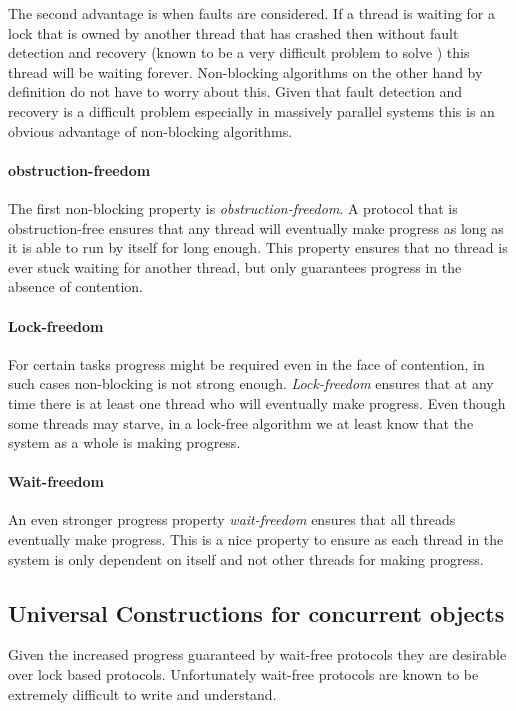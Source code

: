 The second advantage is when faults are considered.
If a thread is waiting for a lock that is owned by another thread that has crashed
then without fault detection and recovery (known to be a very difficult problem to solve \cite{}
) this thread will be waiting forever.
Non-blocking algorithms on the other hand by definition do not have to worry about this.
Given that fault detection and recovery is a difficult problem especially in massively parallel
systems this is an obvious advantage of non-blocking algorithms.

\paragraph{obstruction-freedom}
The first non-blocking property is \emph{obstruction-freedom}.
A protocol that is obstruction-free ensures that any thread will eventually make progress
as long as it is able to run by itself for long enough.
This property ensures that no thread is ever stuck waiting for another thread, but only guarantees
progress in the absence of contention.

\paragraph{Lock-freedom}
For certain tasks progress might be required even in the face of contention, in such cases
non-blocking is not strong enough.
\emph{Lock-freedom} ensures that at any time there is at least one thread who will eventually make progress.
Even though some threads may starve, in a lock-free algorithm we at least know that the
system as a whole is making progress.

\paragraph{Wait-freedom}
An even stronger progress property \emph{wait-freedom} ensures that
all threads eventually make progress.
This is a nice property to ensure as each thread in the system
is only dependent on itself and not other threads for making progress.






\subsection{Universal Constructions for concurrent objects}
\label{sec:univ-const}


Given the increased progress guaranteed by wait-free protocols
they are desirable over lock based protocols.
Unfortunately wait-free protocols are
known to be extremely difficult to write and understand.

